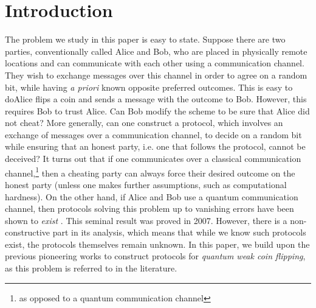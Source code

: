 \documentclass{theoretics}
\begin{document}
\section{Introduction\label{sec:intro}}
The problem we study in this paper is easy to state. Suppose
there are two parties, conventionally called Alice and Bob, who are
placed in physically remote locations and can communicate with each
other using a communication channel. They wish to exchange messages
over this channel in order to agree on a random bit, while having \emph{a priori} known opposite preferred outcomes.
This is easy to do\textemdash Alice flips a coin and sends a message
with the outcome to Bob. However, this requires Bob to trust Alice. Can Bob modify
the scheme to be sure that Alice did not cheat? More generally, can
one construct a protocol, which involves an exchange of messages over
a communication channel, to decide on a random bit while ensuring
that an honest party, i.e. one that follows the protocol, cannot
be deceived? It turns out that if one communicates over a classical
communication channel,\footnote{as opposed to a quantum communication channel} then
a cheating party can always force their desired outcome on the honest
party (unless one makes further assumptions, such as computational hardness).
On the other hand, if Alice and Bob use a quantum
communication channel, then protocols solving this problem up to
vanishing errors have been shown to \emph{exist} \cite{Mochon07}. This seminal result was proved in
2007. However, there is a non-constructive part in its analysis, which means that while we know such protocols exist, the protocols themselves remain unknown.  %
%
In this paper, we build upon the previous
pioneering works to %
construct protocols for
\emph{quantum weak coin flipping}, as this problem is referred to in the literature.
\end{document}
